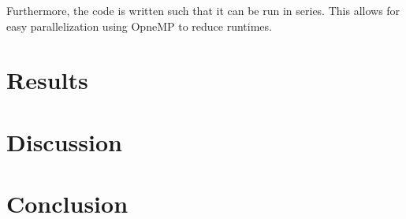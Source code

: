 \documentclass[english,notitlepage,reprint,nofootinbib]{revtex4-1}  %
\begin{document}
Furthermore, the code is written such that it can be run in series. This allows for easy parallelization using OpneMP to reduce runtimes.

\section{Results}\label{sec:results}



\section{Discussion}\label{sec:discussion}
%


\section{Conclusion}\label{sec:conclusion}



\onecolumngrid

%


\newpage
\appendix
\raggedbottom
\end{document}
